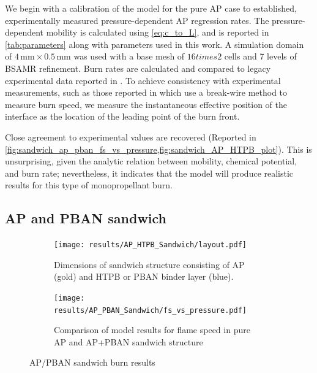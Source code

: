 \documentclass[colorinlistoftodos,review]{elsarticle}
\begin{document}
We begin with a calibration of the model for the pure AP case to established, experimentally measured pressure-dependent AP regression rates.
The pressure-dependent mobility is calculated using \cref{eq:c_to_L}, and is reported in \cref{tab:parameters} along with parameters used in this work.
A simulation domain of $4\,\mathrm{mm} \times 0.5\,\mathrm{mm}$ was used with a base mesh of $16 times 2$ cells and 7 levels of BSAMR refinement.
Burn rates are calculated and compared to legacy experimental data reported in \cite{price1983combustion}.
To achieve consistency with experimental measurements, such as those reported in \cite{price1984combustion, knott2002modeling, hayakawa2000effect} which use a break-wire method to measure burn speed, we measure the instantaneous effective position of the interface as the location of the leading point of the burn front.

Close agreement to experimental values are recovered (Reported in \cref{fig:sandwich_ap_pban_fs_vs_pressure,fig:sandwich_AP_HTPB_plot}).
This is unsurprising, given the analytic relation between mobility, chemical potential, and burn rate; nevertheless, it indicates that the model will produce realistic results for this type of monopropellant burn.

\subsection{AP and PBAN sandwich}

\begin{figure}
  \centering
  \begin{subfigure}{0.48\linewidth}
    \texttt{[image: results/AP\_HTPB\_Sandwich/layout.pdf]}
    \caption{Dimensions of sandwich structure consisting of AP ({\color{C1}gold}) and HTPB or PBAN binder layer ({\color{C0}blue}).}
    \label{fig:sandwich_layout}
  \end{subfigure}\hfill
  \begin{subfigure}{0.48\linewidth}
    \texttt{[image: results/AP\_PBAN\_Sandwich/fs\_vs\_pressure.pdf]}
    \caption{Comparison of model results for flame speed in pure AP and AP+PBAN sandwich structure } 
    \label{fig:sandwich_ap_pban_fs_vs_pressure} 
  \end{subfigure}
  \caption{
    AP/PBAN sandwich burn results
  }
\end{figure}
\end{document}
